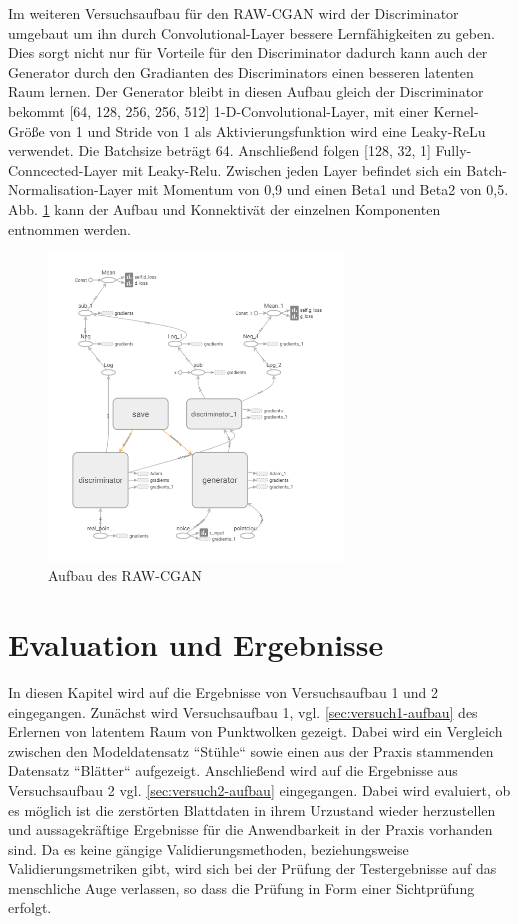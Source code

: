 \documentclass{llncs}
\begin{document}
Im weiteren Versuchsaufbau für den RAW-CGAN wird der Discriminator umgebaut um ihn durch Convolutional-Layer bessere Lernfähigkeiten zu geben. Dies sorgt nicht nur für Vorteile für den Discriminator dadurch kann auch der Generator durch den Gradianten des Discriminators einen besseren latenten Raum lernen. Der Generator bleibt in diesen Aufbau gleich der Discriminator bekommt [64, 128, 256, 256, 512] 1-D-Convolutional-Layer, mit einer Kernel-Größe von 1 und Stride von 1 als Aktivierungsfunktion wird eine Leaky-ReLu verwendet. Die Batchsize beträgt 64. Anschließend folgen [128, 32, 1] Fully-Conncected-Layer mit Leaky-Relu. Zwischen jeden Layer befindet sich ein Batch-Normalisation-Layer mit Momentum von 0,9 und einen Beta1 und Beta2 von 0,5. Abb. \ref{fig:Bild55} kann der Aufbau und Konnektivät der einzelnen Komponenten entnommen werden.

\begin{figure}[htbp] 
	\centering
	\includegraphics[width=0.7\textwidth]{point-cgan.png}
	\caption{Aufbau des RAW-CGAN}
	\label{fig:Bild55}
\end{figure}
\newpage

\section{Evaluation und Ergebnisse}

In diesen Kapitel wird auf die Ergebnisse von Versuchsaufbau 1 und 2 eingegangen. Zunächst wird Versuchsaufbau 1, vgl. \ref{sec:versuch1-aufbau} des Erlernen von latentem Raum von Punktwolken gezeigt. Dabei wird ein Vergleich zwischen den Modeldatensatz ``Stühle`` sowie einen aus der Praxis stammenden Datensatz ``Blätter`` aufgezeigt. Anschließend wird auf die Ergebnisse aus Versuchsaufbau 2 vgl. \ref{sec:versuch2-aufbau} eingegangen. Dabei wird evaluiert, ob es möglich ist die zerstörten Blattdaten in ihrem Urzustand wieder herzustellen und aussagekräftige Ergebnisse für die Anwendbarkeit in der Praxis vorhanden sind. Da es keine gängige Validierungsmethoden, beziehungsweise Validierungsmetriken gibt, wird sich bei der Prüfung der Testergebnisse auf das menschliche Auge verlassen, so dass die Prüfung in Form einer Sichtprüfung erfolgt.
\end{document}
